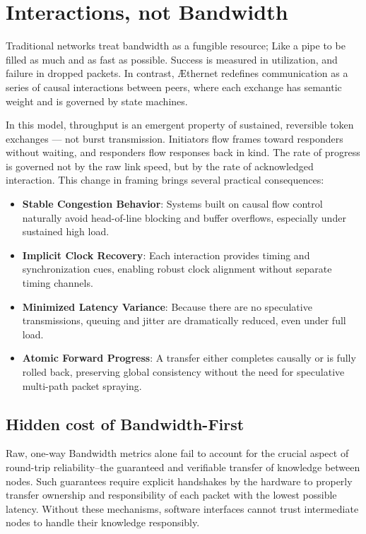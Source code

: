 \documentclass[../../../OAE-SPEC-MAIN.tex]{subfiles}
\begin{document}
\section{Interactions, not Bandwidth}

Traditional networks treat bandwidth as a fungible resource; Like a pipe to be filled as much and as fast as possible. Success is measured in utilization, and failure in dropped packets. In contrast, \AE thernet redefines communication as a series of causal interactions between peers, where each exchange has semantic weight and is governed by \LINK state machines.

In this model, throughput is an emergent property of sustained, reversible token exchanges — not burst transmission. Initiators flow frames toward responders without waiting, and responders flow responses back in kind. The rate of progress is governed not by the raw link speed, but by the rate of acknowledged interaction. This change in framing brings several practical consequences:
\begin{itemize}
\item \textbf{Stable Congestion Behavior}: Systems built on causal flow control naturally avoid head-of-line blocking and buffer overflows, especially under sustained high load.
\item \textbf{Implicit Clock Recovery}: Each interaction provides timing and synchronization cues, enabling robust clock alignment without separate timing channels.
\item \textbf{Minimized Latency Variance}: Because there are no speculative transmissions, queuing and jitter are dramatically reduced, even under full load.
\item \textbf{Atomic Forward Progress}: A transfer either completes causally or is fully rolled back, preserving global consistency without the need for speculative multi-path packet spraying.
\end{itemize}


\subsection{Hidden cost of Bandwidth-First}

Raw, one-way Bandwidth metrics alone fail to account for the crucial aspect of round-trip reliability--the guaranteed and verifiable transfer of knowledge between nodes. Such guarantees require explicit handshakes by the hardware to properly transfer ownership and responsibility of each packet with the lowest possible latency. Without these mechanisms, software interfaces cannot trust intermediate nodes to handle their knowledge responsibly.
\end{document}
